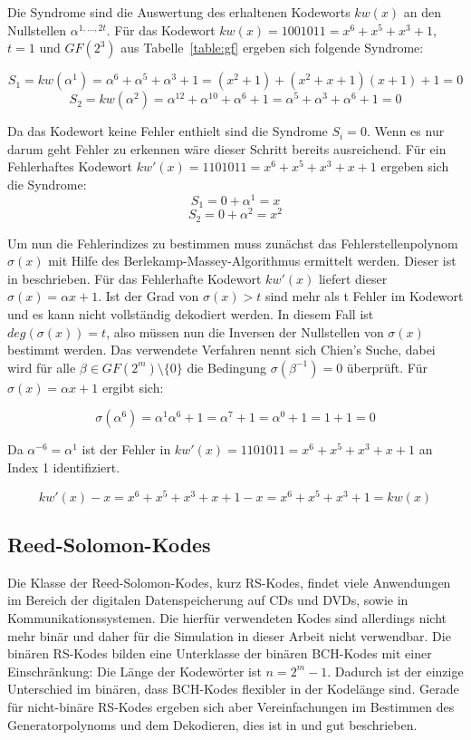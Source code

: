 Die Syndrome sind die Auswertung des erhaltenen Kodeworts $kw(x)$ an den Nullstellen $\alpha^{1,...,2t}$. 
Für das Kodewort $kw(x) = 1001011 = x^6 + x^5 + x^3 + 1$, $t=1$ und $GF(2^3)$ aus Tabelle~\ref{table:gf} ergeben sich folgende Syndrome:

$$S_1 = kw(\alpha^1) = \alpha^6 + \alpha^5 + \alpha^3 + 1 = (x^2 +1) + (x^2+x+1)(x+1)+1 = 0$$
$$S_2 = kw(\alpha^2) = \alpha^{12} + \alpha^{10} + \alpha^6 + 1 = \alpha^5 + \alpha^3 + \alpha^6 + 1 = 0 $$

Da das Kodewort keine Fehler enthielt sind die Syndrome $S_i = 0$. Wenn es nur darum geht Fehler zu erkennen wäre dieser Schritt bereits ausreichend. Für ein Fehlerhaftes Kodewort $kw'(x) = 1101011 = x^6 + x^5 + x^3 + x+1$ ergeben sich die Syndrome: 
$$S_1 = 0 + \alpha^1 = x$$
$$S_2 = 0 + \alpha^2 = x^2$$

Um nun die Fehlerindizes zu bestimmen muss zunächst das Fehlerstellenpolynom $\sigma(x)$ mit Hilfe des Berlekamp-Massey-Algorithmus ermittelt werden. Dieser ist in \cite[S. 59ff]{morelos2006art} beschrieben. Für das Fehlerhafte Kodewort $kw'(x)$ liefert dieser $\sigma(x) = \alpha x +1$. Ist der Grad von $\sigma(x) > t$ sind mehr als t Fehler im Kodewort und es kann nicht vollständig dekodiert werden. In diesem Fall ist $deg(\sigma(x)) = t$, also müssen nun die Inversen der Nullstellen von $\sigma(x)$ bestimmt werden. Das verwendete Verfahren nennt sich Chien's Suche, dabei wird für alle $\beta \in GF(2^m)\setminus\{0\}$ die Bedingung $\sigma(\beta^{-1}) = 0$ überprüft.\cite[S. 63]{morelos2006art} Für $\sigma(x) = \alpha x +1$ ergibt sich:

$$\sigma(\alpha^6) = \alpha^1\alpha^6 +1 = \alpha^7 +1 = \alpha^0 + 1 = 1 + 1 = 0$$

Da $\alpha^{-6} = \alpha^1$ ist der Fehler in $kw'(x) = 1101011 = x^6 + x^5 + x^3 + x+1$ an Index 1 identifiziert.

$$kw'(x) - x = x^6 + x^5 + x^3 + x+1 -x = x^6+x^5+x^3+1=kw(x)$$



\subsection{Reed-Solomon-Kodes}

Die Klasse der Reed-Solomon-Kodes, kurz RS-Kodes, findet viele Anwendungen im Bereich der digitalen Datenspeicherung auf CDs und DVDs, sowie in Kommunikationssystemen.\cite[S. 73]{morelos2006art} Die hierfür verwendeten Kodes sind allerdings nicht mehr binär und daher für die Simulation in dieser Arbeit nicht verwendbar. Die binären RS-Kodes bilden eine Unterklasse der binären BCH-Kodes mit einer Einschränkung: Die Länge der Kodewörter ist $n = 2^m-1$.\cite[S. 173]{huffman2010fundamentals} Dadurch ist der einzige Unterschied im binären, dass BCH-Kodes flexibler in der Kodelänge sind. Gerade für nicht-binäre RS-Kodes ergeben sich aber Vereinfachungen im Bestimmen des Generatorpolynoms und dem Dekodieren, dies ist in \cite[S. 73ff]{morelos2006art} und \cite[S. 173ff]{huffman2010fundamentals} gut beschrieben.
